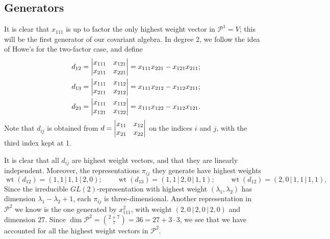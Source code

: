 \documentclass[reqno,11pt]{amsart}
\theoremstyle{remark}
\theoremstyle{definition}
\numberwithin{equation}{section}
\newcommand{\bbar}{\,\big|\,}
\newcommand\la{{\lambda}}
\newcommand{\Pol}{\mathcal{P}}
\newcommand{\wt}{\operatorname{wt}}
\begin{document}
\subsection{Generators} It is clear that $x_{111}$ is up to factor the only highest weight vector in $\Pol^1=V$; this will be the first generator of our covariant algebra. In degree 2, we follow the idea of Howe's \cite[Theorem 2.1.2]{H} for  the two-factor case, and define
\begin{eqnarray}
\label{dij 222}
&&d_{12}=\left|\begin{matrix} x_{111} & x_{121}\cr x_{211} & x_{221}\end{matrix}\right| = x_{111}x_{221}-x_{121}x_{211};\\
\nonumber
&&d_{13}=\left|\begin{matrix} x_{111} & x_{112}\cr x_{211} & x_{212}\end{matrix}\right| = x_{111}x_{212}-x_{112}x_{211};\\
\nonumber
&&d_{23}=\left|\begin{matrix} x_{111} & x_{112}\cr x_{121} & x_{122}\end{matrix}\right| = x_{111}x_{122}-x_{112}x_{121}.
\end{eqnarray}
Note that $d_{ij}$ is obtained from  $d=\left|\begin{matrix} x_{11} & x_{12}\cr x_{21} & x_{22}\end{matrix}\right|$ on the indices $i$ and $j$, with the third index kept at 1. 

It is clear that all $d_{ij}$ are highest weight vectors, and that they are linearly independent. Moreover, the representations $\pi_{ij}$ they generate have highest weights
\[
\wt(d_{12})=(1,1\bbar 1,1\bbar 2,0);\qquad \wt(d_{13})=(1,1\bbar 2,0\bbar 1,1);\qquad \wt(d_{12})=(2,0\bbar 1,1\bbar 1,1).
\]
Since the irreducible $GL(2)$-representation with highest weight $(\la_1,\la_2)$ has dimension $\la_1-\la_2+1$, each $\pi_{ij}$ is three-dimensional. Another representation in $\Pol^2$ we know is the one generated by $x_{111}^2$, with weight $(2,0\bbar 2,0\bbar 2,0)$ and dimension $27$. Since $\dim\Pol^2=\binom{2+7}{7}=36=27+3\cdot 3$, we see that we have accounted for all the highest weight vectors in $\Pol^2$.
\end{document}
